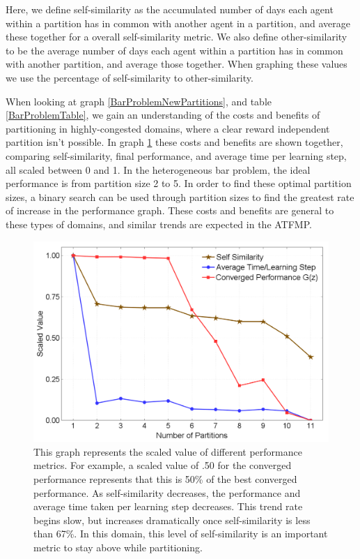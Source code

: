 \documentclass[onehalf,11pt]{beavtex}
\begin{document}
Here, we define self-similarity as the accumulated number of days each agent within a partition has in common with another agent in a partition, and average these together for a overall self-similarity metric. We also define other-similarity to be the average number of days each agent within a partition has in common with another partition, and average those together. When graphing these values we use the percentage of self-similarity to other-similarity.

When looking at graph \ref{BarProblemNewPartitions}, and table \ref{BarProblemTable}, we gain an understanding of the costs and benefits of partitioning in highly-congested domains, where a clear reward independent partition isn't possible. In graph \ref{BarProblemComparison} these costs and benefits are shown together, comparing self-similarity, final performance, and average time per learning step, all scaled between 0 and 1. In the heterogeneous bar problem, the ideal performance is from partition size 2 to 5. In order to find these optimal partition sizes, a binary search can be used through partition sizes to find the greatest rate of increase in the performance graph. These costs and benefits are general to these types of domains, and similar trends are expected in the ATFMP.

\begin{figure}
\centering
\includegraphics[width=1.0\columnwidth]{BarProblemComparison}
\caption{This graph represents the scaled value of different performance metrics. For example, a scaled value of .50 for the converged performance represents that this is 50\% of the best converged performance. As self-similarity decreases, the performance and average time taken per learning step decreases. This trend rate begins slow, but increases dramatically once self-similarity is less than 67\%. In this domain, this level of self-similarity is an important metric to stay above while partitioning.}
\label{BarProblemComparison}
\end{figure}
\end{document}
